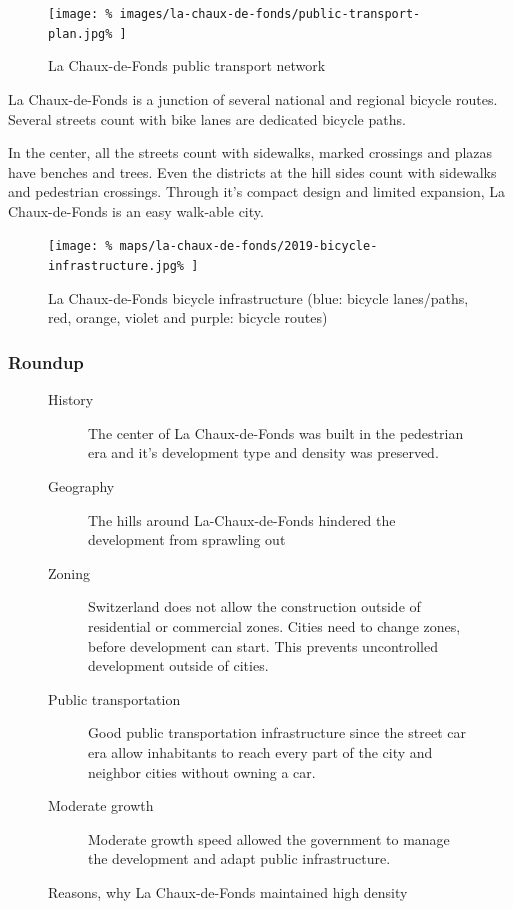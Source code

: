 \documentclass{article}
\begin{document}
\begin{multicols}{2}
			
			
			\begin{figure}[H]
				\texttt{[image: \%
					images/la-chaux-de-fonds/public-transport-plan.jpg\%
				]}
				\caption{La Chaux-de-Fonds public transport network  \cite{TransN:LaChauxDeFonds}}
				\label{fig:map:la-chaux-de-fonds-public-transport}
			\end{figure}
			
			La Chaux-de-Fonds is a junction of several national and regional bicycle routes. Several streets count with bike lanes are dedicated bicycle paths.
			
			In the center, all the streets count with sidewalks, marked crossings and plazas have benches and trees. Even the districts at the hill sides count with sidewalks and pedestrian crossings.
			Through it's compact design and limited expansion, La Chaux-de-Fonds is an easy walk-able city.
			
			\begin{figure}[H]
				\texttt{[image: \%
					maps/la-chaux-de-fonds/2019-bicycle-infrastructure.jpg\%
				]}
				\caption{La Chaux-de-Fonds bicycle infrastructure (blue: bicycle lanes/paths, red, orange, violet and purple: bicycle routes)  \cite{OpenCycleMap:LaChauxDeFonds}}
				\label{fig:map:la-chaux-de-fonds-bicycle-infrastructure}
			\end{figure}
			
			
			\subsubsection{Roundup}
			
			\begin{figure}[H]
				\begin{description}
					\item [History] The center of La Chaux-de-Fonds was built in the pedestrian era and it's development type and density was preserved.
					\item [Geography] The hills around La-Chaux-de-Fonds hindered the development from sprawling out
					\item [Zoning] Switzerland does not allow the construction outside of residential or commercial zones. Cities need to change zones, before development can start. This prevents uncontrolled development outside of cities.
					\item [Public transportation] Good public transportation infrastructure since the street car era allow inhabitants to reach every part of the city and neighbor cities without owning a car.
					\item [Moderate growth] Moderate growth speed allowed the government to manage the development and adapt public infrastructure.
				\end{description}
				\caption{Reasons, why La Chaux-de-Fonds maintained high density}
				\label{fig:la-chaux-de-fonds-development-reasons}
			\end{figure}
			

\end{multicols}
\end{document}
